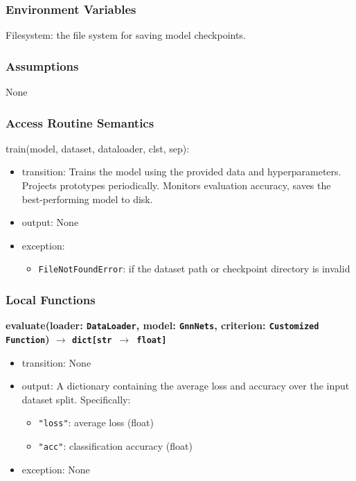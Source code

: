\documentclass[12pt, titlepage]{article}
\begin{document}
\subsubsection{Environment Variables}
Filesystem: the file system for saving model checkpoints.

\subsubsection{Assumptions}
None

\subsubsection{Access Routine Semantics}

\noindent train(model, dataset, dataloader, clst, sep):
\begin{itemize}
\item transition: Trains the model using the provided data and hyperparameters. Projects prototypes periodically. Monitors evaluation accuracy, saves the best-performing model to disk.
\item output: None
\item exception:     
    \begin{itemize}
        \item \texttt{FileNotFoundError}: if the dataset path or checkpoint directory is invalid
    \end{itemize}
\end{itemize}

\subsubsection{Local Functions}

\noindent
\textbf{evaluate(loader: \texttt{DataLoader}, model: \texttt{GnnNets}, criterion: \texttt{Customized Function}) \(\rightarrow\) \texttt{dict[str \(\rightarrow\) float]}}
\begin{itemize}
  \item transition: None
  \item output: A dictionary containing the average loss and accuracy over the input dataset split. Specifically:
    \begin{itemize}
      \item \texttt{"loss"}: average loss (float)
      \item \texttt{"acc"}: classification accuracy (float)
    \end{itemize}
  \item exception: None
\end{itemize}
\end{document}
